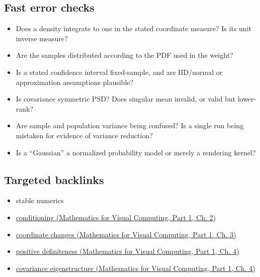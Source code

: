 \subsection{Fast error checks}\label{appendix-cb5af353ef77-fast-error-checks}

\hypertarget{appendix-cb5af353ef77-fast-error-checks}{}

\begin{itemize}
\tightlist
\item
  Does a density integrate to one in the stated coordinate measure? Is its unit inverse measure?
\item
  Are the samples distributed according to the PDF used in the weight?
\item
  Is a stated confidence interval fixed-sample, and are IID/normal or approximation assumptions plausible?
\item
  Is covariance symmetric PSD? Does singular mean invalid, or valid but lower-rank?
\item
  Are sample and population variance being confused? Is a single run being mistaken for evidence of variance reduction?
\item
  Is a ``Gaussian'' a normalized probability model or merely a rendering kernel?
\end{itemize}

\subsection{Targeted backlinks}\label{appendix-cb5af353ef77-targeted-backlinks}

\hypertarget{appendix-cb5af353ef77-targeted-backlinks}{}

\begin{itemize}
\tightlist
\item
  {stable numerics}
\item
  \href{../02-Mathematics-for-Visual-Computing-P01/main.pdf\#nameddest=01-foundations-i-ch018-an-inverse-can-exist-and-still-amplify-uncertainty}{conditioning (Mathematics for Visual Computing, Part 1, Ch. 2)}
\item
  \href{../02-Mathematics-for-Visual-Computing-P01/main.pdf\#nameddest=01-foundations-i-ch019-coordinates-can-change-while-the-geometric-object-stays-still}{coordinate changes (Mathematics for Visual Computing, Part 1, Ch. 3)}
\item
  \href{../02-Mathematics-for-Visual-Computing-P01/main.pdf\#nameddest=01-foundations-i-ch020-positive-definiteness-is-a-structural-promise}{positive definiteness (Mathematics for Visual Computing, Part 1, Ch. 4)}
\item
  \href{../02-Mathematics-for-Visual-Computing-P01/main.pdf\#nameddest=01-foundations-i-ch020-diagonalization-leads-to-the-stronger-symmetric-spectral-theorem}{covariance eigenstructure (Mathematics for Visual Computing, Part 1, Ch. 4)}
\end{itemize}

